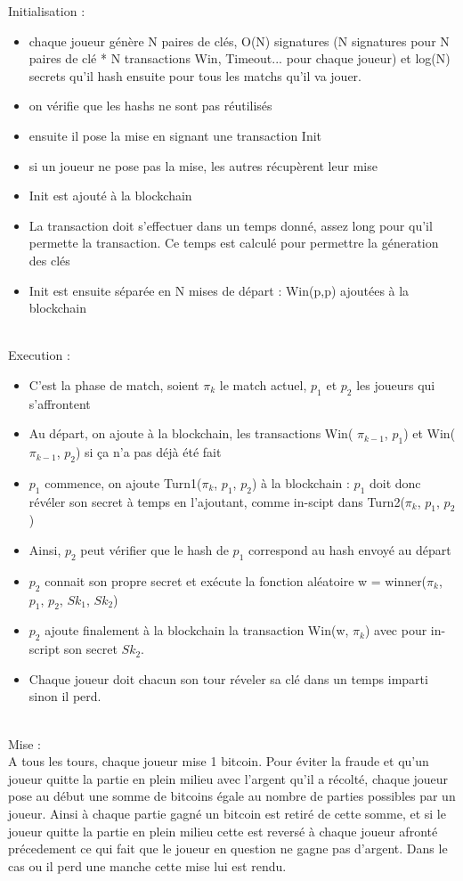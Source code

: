 \documentclass{article}
\begin{document}
Initialisation : \\
\begin{itemize}
\item chaque joueur génère N paires de clés, O(N) signatures (N signatures pour N paires de clé * N transactions Win, Timeout... pour chaque joueur) et log(N) secrets qu'il hash ensuite pour tous les matchs qu'il va jouer.
\item on vérifie que les hashs ne sont pas réutilisés
\item ensuite il pose la mise en signant une transaction Init
\item si un joueur ne pose pas la mise, les autres récupèrent leur mise
\item Init est ajouté à la blockchain
\item La transaction doit s'effectuer dans un temps donné, assez long pour qu'il permette la transaction. Ce temps est calculé pour permettre la géneration des clés 
\item Init est ensuite séparée en N mises de départ : Win(p,p) ajoutées à la blockchain \\
\end{itemize}
\\
Execution :  \\
\begin{itemize}
\item C'est la phase de match, soient $\pi_{k}$ le match actuel, $p_{1}$ et $p_{2}$ les joueurs qui s'affrontent
\item Au départ, on ajoute à la blockchain, les transactions Win( $\pi_{k-1}$, $p_{1}$) et Win( $\pi_{k-1}$, $p_{2}$) si ça n'a pas déjà été fait
\item $p_{1}$ commence, on ajoute Turn1($\pi_{k}$, $p_{1}$, $p_{2}$) à la blockchain :  $p_{1}$ doit donc révéler son secret à temps en l'ajoutant, comme in-scipt dans Turn2($\pi_{k}$, $p_{1}$, $p_{2}$)
\item Ainsi, $p_{2}$ peut vérifier que le hash de $p_{1}$ correspond au hash envoyé au départ
\item $p_{2}$ connait son propre secret et exécute la fonction aléatoire w = winner($\pi_{k}$, $p_{1}$, $p_{2}$, $Sk_{1}$, $Sk_{2}$)
\item $p_{2}$ ajoute finalement à la blockchain la transaction Win(w, $\pi_{k}$) avec pour in-script son secret $Sk_{2}$.
\item Chaque joueur doit chacun son tour réveler sa clé dans un temps imparti sinon il perd. \\
\end{itemize}
\\
Mise : \\
 A tous les tours, chaque joueur mise 1 bitcoin. Pour éviter la fraude et qu'un joueur quitte la partie en plein milieu avec l'argent qu'il a récolté, chaque joueur pose au début une somme de bitcoins égale au nombre de parties possibles par un joueur. Ainsi à chaque partie gagné un bitcoin est retiré de cette somme, et si le joueur quitte la partie en plein milieu cette est reversé à chaque joueur afronté précedement ce qui fait que le joueur en question ne gagne pas d'argent. Dans le cas ou il perd une manche cette mise lui est rendu.
\end{document}

